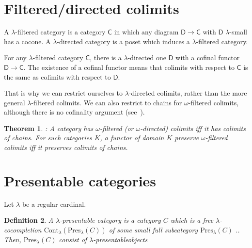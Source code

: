 \documentclass{article}
\newcommand{\CC}{\mathsf{C}}
\newcommand{\DD}{\mathsf{D}}
\newcommand{\Cont}[1]{\text{Cont}_{#1}}
\newcommand{\Pres}[1]{\text{Pres}_{#1}}
\newtheorem{theorem}{Theorem}[section]
\newtheorem{definition}[theorem]{Definition}
\begin{document}
\section{Filtered/directed colimits}
A $\lambda$-filtered category is a category $\CC$ in which any diagram
$\DD\to \CC$ with $\DD$ $\lambda$-small has a cocone. A $\lambda$-directed
category is a poset which induces a $\lambda$-filtered category.

For any $\lambda$-filtered category $\CC$, there is a $\lambda$-directed one
$\DD$ with a cofinal functor $\DD\to\CC$. The existence of a cofinal functor
means that colimits with respect to $\CC$ is the same as colimits with respect
to $\DD$.

That is why we can restrict ourselves to $\lambda$-directed colimits, rather
than the more general $\lambda$-filtered colimits. We can also restrict to
chains for $\omega$-filtered colimits, although there is no cofinality argument
(see~\cite[Example 1.8]{adamek_rosicky}).
\begin{theorem}
 \cite[Corollary 1.7]{adamek_rosicky}:
 A category has $\omega$-filtered (or $\omega$-directed) colimits iff it has
 colimits of chains. For such categories $K$, a functor of domain $K$ preserve
 $\omega$-filtered colimits iff it preserves colimits of chains.
\end{theorem}

  \section{Presentable categories}
  Let $\lambda$ be a regular cardinal.
  \begin{definition}
  A $\lambda$-presentable category is a
  category $C$ which is a free $\lambda$-cocompletion
  $\Cont\lambda(\Pres\lambda(C))$ of
  some small full subcategory $\Pres\lambda(C)$
     \cite[Representation theorem 1.46]{adamek_rosicky}..
	  Then, $\Pres\lambda(C)$ consist of \emph{$\lambda$-presentableobjects}
  \end{definition}
\end{document}
